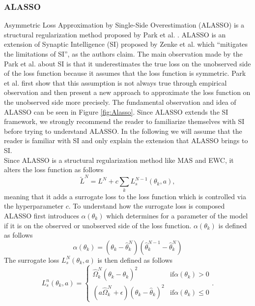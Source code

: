 \subsubsection{ALASSO}
Asymmetric Loss Approximation by Single-Side Overestimation (ALASSO) is a structural regularization method proposed by Park et al. \cite{park2019continual}.
ALASSO is an extension of Synaptic Intelligence (SI) proposed by Zenke et al. \cite{zenke2017continual} which \enquote{mitigates the limitations of SI}, as
the authors claim. The main observation made by the Park et al. about SI is that it underestimates the true loss on the unobserved side of the loss function
because it assumes that the loss function is symmetric. Park et al. first show that this assumption is not always true through empirical observation and then
present a new approach to approximate the loss function on the unobserved side more precisely. The fundamental observation and idea of ALASSO can be seen in
Figure \ref{fig:Alasso}. Since ALASSO extends the SI framework, we strongly recommend the reader to familiarize themselves with SI before trying to understand
ALASSO. In the following we will assume that the reader is familiar with SI and only explain the extension that ALASSO brings to SI. \\
Since ALASSO is a structural regularization method like MAS and EWC, it alters the loss function as follows
\begin{equation}
    \tilde{L}^N = L^N + c \sum_k L_s^{N-1}(\theta_k,a),
\end{equation}
meaning that it adds a surrogate loss to the loss function which is controlled via the hyperparameter $c$. To understand how the surrogate loss is composed
ALASSO first introduces $\alpha(\theta_k)$ which determines for a parameter of the model if it is on the observed or unobserved side of the loss function.
$\alpha(\theta_k)$ is defined as follows
\begin{equation}
    \alpha(\theta_k) = (\theta_k - \hat{\theta}^N_k) (\hat{\theta}^{N-1}_k - \hat{\theta}^N_k)
\end{equation}
The surrogate loss $L^N_s(\theta_k,a)$ is then defined as follows
\begin{equation}
    L_s^n(\theta_k,a) = \begin{cases} \hat{\Omega}^N_k (\theta_k - \hat{\theta}_k)^2 & \text{if} \alpha(\theta_k) > 0 \\
    (a \hat{\Omega}^N_k + \epsilon)(\theta_k - \hat{\theta}_k)^2 & \text{if} \alpha(\theta_k) \leq 0 \end{cases}.
\end{equation}

